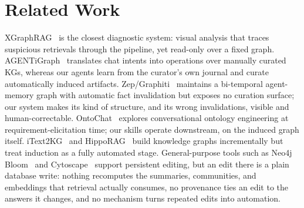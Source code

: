 \documentclass[sigconf]{acmart}
\begin{document}
\section{Related Work}
XGraphRAG~\cite{wang2025xgraphraginteractivevisualanalysis} is the closest diagnostic system: visual analysis that traces suspicious retrievals through the pipeline, yet read-only over a fixed graph. AGENTiGraph~\cite{zhao2025agentigraph} translates chat intents into operations over manually curated KGs, whereas our agents learn from the curator's own journal and curate automatically induced artifacts. Zep/Graphiti~\cite{rasmussen2025zep} maintains a bi-temporal agent-memory graph with automatic fact invalidation but exposes no curation surface; our system makes its kind of structure, and its wrong invalidations, visible and human-correctable. OntoChat~\cite{zhang2024ontochat} explores conversational ontology engineering at requirement-elicitation time; our skills operate downstream, on the induced graph itself. iText2KG~\cite{lairgi2024itext2kg} and HippoRAG~\cite{gutierrez2024hipporag} build knowledge graphs incrementally but treat induction as a fully automated stage. General-purpose tools such as Neo4j Bloom~\cite{neo4j_bloom} and Cytoscape~\cite{shannon2003cytoscape} support persistent editing, but an edit there is a plain database write: nothing recomputes the summaries, communities, and embeddings that retrieval actually consumes, no provenance ties an edit to the answers it changes, and no mechanism turns repeated edits into automation.

\begin{table}[t]
\centering
\footnotesize
\setlength{\tabcolsep}{3.5pt}
\caption{Feature comparison across diagnostic and graph tools.}
\label{tab:feature_comparison}
%
\end{table}
\end{document}
